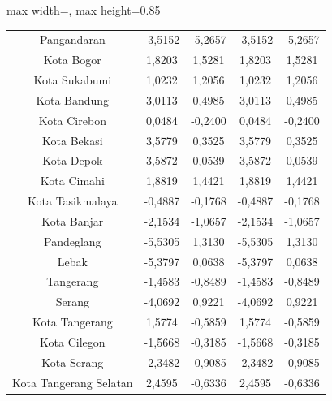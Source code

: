 \begin{table}[H]
\begin{adjustbox}{max width=\textwidth, max height=0.85\textheight}
\begin{tabular}{|c|c|c|c|c|}
Pangandaran & -3,5152 & -5,2657 & -3,5152 & -5,2657 \\
Kota Bogor & 1,8203 & 1,5281 & 1,8203 & 1,5281 \\
Kota Sukabumi & 1,0232 & 1,2056 & 1,0232 & 1,2056 \\
Kota Bandung & 3,0113 & 0,4985 & 3,0113 & 0,4985 \\
Kota Cirebon & 0,0484 & -0,2400 & 0,0484 & -0,2400 \\
Kota Bekasi & 3,5779 & 0,3525 & 3,5779 & 0,3525 \\
Kota Depok & 3,5872 & 0,0539 & 3,5872 & 0,0539 \\
Kota Cimahi & 1,8819 & 1,4421 & 1,8819 & 1,4421 \\
Kota Tasikmalaya & -0,4887 & -0,1768 & -0,4887 & -0,1768 \\
Kota Banjar & -2,1534 & -1,0657 & -2,1534 & -1,0657 \\
Pandeglang & -5,5305 & 1,3130 & -5,5305 & 1,3130 \\
Lebak & -5,3797 & 0,0638 & -5,3797 & 0,0638 \\
Tangerang & -1,4583 & -0,8489 & -1,4583 & -0,8489 \\
Serang & -4,0692 & 0,9221 & -4,0692 & 0,9221 \\
Kota Tangerang & 1,5774 & -0,5859 & 1,5774 & -0,5859 \\
Kota Cilegon & -1,5668 & -0,3185 & -1,5668 & -0,3185 \\
Kota Serang & -2,3482 & -0,9085 & -2,3482 & -0,9085 \\
Kota Tangerang Selatan & 2,4595 & -0,6336 & 2,4595 & -0,6336 \\
\hline
\end{tabular}
\end{adjustbox}
\end{table}